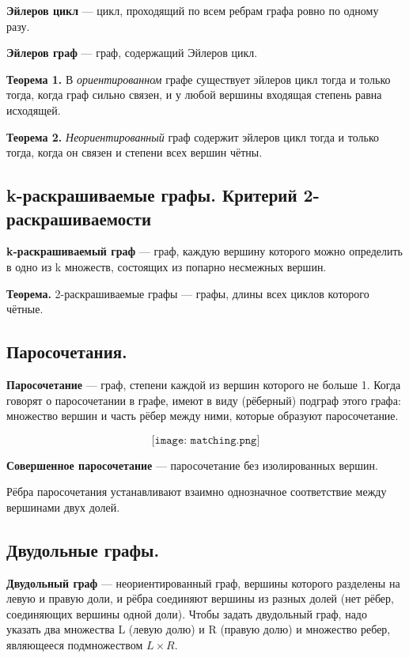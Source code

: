 \documentclass[a4paper, 10pt]{article}
\begin{document}
\textbf{Эйлеров цикл} --- цикл, проходящий по всем ребрам графа ровно по одному разу.

\textbf{Эйлеров граф} --- граф, содержащий Эйлеров цикл.

\textbf{Теорема 1.} В \textit{ориентированном} графе существует эйлеров цикл тогда и только тогда, когда граф сильно связен, и у любой вершины входящая степень равна исходящей.

\textbf{Теорема 2.} \textit{Неориентированный} граф содержит эйлеров цикл тогда и только тогда, когда он связен и степени всех вершин чётны.

\subsection{k-раскрашиваемые графы. Критерий 2-раскрашиваемости}

\textbf{k-раскрашиваемый граф} --- граф, каждую вершину которого можно определить в одно из k множеств, состоящих из попарно несмежных вершин.

\textbf{Теорема.} 2-раскрашиваемые графы --- графы, длины всех циклов которого чётные.


\subsection{Паросочетания.}

\textbf{Паросочетание} --- граф, степени каждой из вершин которого не больше 1. Когда говорят о паросочетании в графе, имеют в виду (рёберный) подграф этого графа: множество вершин и часть рёбер между ними, которые образуют паросочетание.

$$\texttt{[image: matсhing.png]}$$

\textbf{Совершенное паросочетание} --- паросочетание без изолированных вершин.

Рёбра паросочетания устанавливают взаимно однозначное соответствие между вершинами двух долей.

\subsection{Двудольные графы.}

\textbf{Двудольный граф} --- неориентированный граф, вершины которого разделены на левую и правую доли, и рёбра соединяют вершины из разных долей (нет рёбер, соединяющих вершины одной доли). Чтобы задать двудольный граф, надо указать два множества L (левую долю) и R (правую долю) и множество ребер, являющееся подмножеством $L \times R$.
\end{document}
